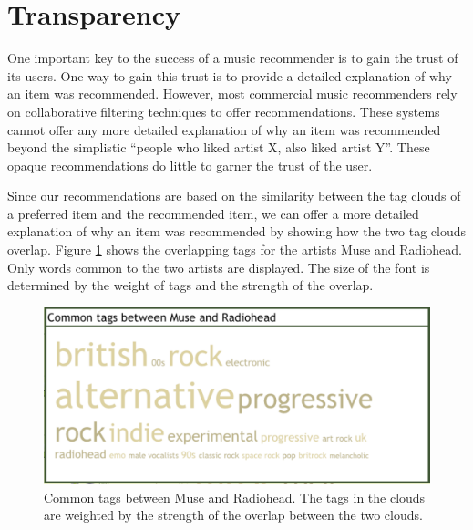 \documentclass{article}
\begin{document}
\section{Transparency}
One important key to the success  of a music recommender is to gain the
trust of its users.  One way to gain this trust is to provide
a detailed explanation of why an item was recommended. However,
most commercial music recommenders rely on collaborative filtering
techniques to offer recommendations.  These systems cannot offer
any more detailed explanation of why an item was recommended beyond
the simplistic ``people who liked artist X, also liked artist Y''.
These opaque recommendations do little to garner the  trust of the user.

Since our recommendations are based on the similarity between  the tag clouds
of a preferred item and the recommended item, we can
offer a more detailed explanation of why an item was recommended
by showing how the two tag clouds overlap. Figure \ref{fig:commontags} shows
the overlapping tags for the artists Muse and Radiohead.
Only words common to the two artists are displayed. The size of the
font is determined by the weight of tags and the strength of the
overlap.

\begin{figure}[ht]
\begin{center}
\includegraphics[width=1.0\columnwidth]{radiohead-muse-commontags}
\end{center}
\caption{Common tags between Muse and Radiohead. 
The tags in the 
clouds are weighted by the strength of the overlap between the two clouds.}
\label{fig:commontags}
\end{figure}
\end{document}
